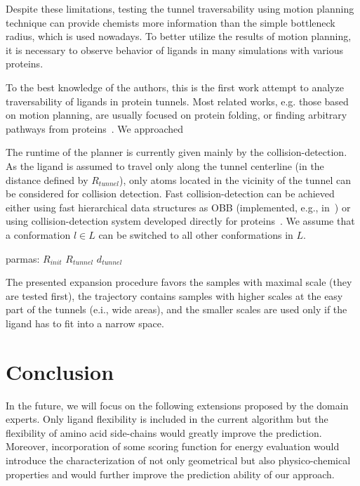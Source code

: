 \documentclass{svmult}
\def\dt{d_{tunnel}}
\def\RI{R_{init}}
\def\rv{R_{tunnel}}
\def\L{L}
\begin{document}
Despite these limitations, testing the tunnel traversability using motion planning technique can provide chemists more information
than the simple bottleneck radius, which is used nowadays.
To better utilize the results of motion planning, it is necessary to observe behavior of ligands in many simulations with various
proteins.

To the best knowledge of the authors, this is the first work attempt to analyze traversability of ligands in protein tunnels.
Most related works, e.g. those based on motion planning, are usually focused on protein folding, or finding arbitrary pathways
from proteins~\cite{cortes2010simulating,guieysse2008structure}.
We approached 

The runtime of the planner is currently given mainly by the collision-detection.
As the ligand is assumed to travel only along the tunnel centerline (in the distance defined by $\rv$),
only atoms located in the vicinity of the tunnel can be considered for collision detection.
Fast collision-detection can be achieved either using fast hierarchical data structures as OBB (implemented, e.g., in~\cite{ozcollide})
    or using collision-detection system developed directly for proteins~\cite{ruiz2005biocd}.
We assume that a conformation $l \in \L$ can be switched to all other conformations in $\L$.

parmas:
$\RI$
$\rv$
$\dt$


The presented expansion procedure favors the samples with maximal scale (they are tested first), the trajectory contains samples with higher scales at the easy part of the tunnels (e.i., wide areas), and the smaller scales are used only if the ligand has to fit into a narrow space.


\section{Conclusion }
In the future, we will focus on the following extensions proposed by the domain experts.
Only ligand flexibility is included in the current algorithm but the flexibility of amino acid side-chains would greatly improve the prediction. 
Moreover, incorporation of some scoring function for energy evaluation would introduce the characterization of not only geometrical but also physico-chemical properties and would further improve the prediction ability of our approach.




\end{document}
